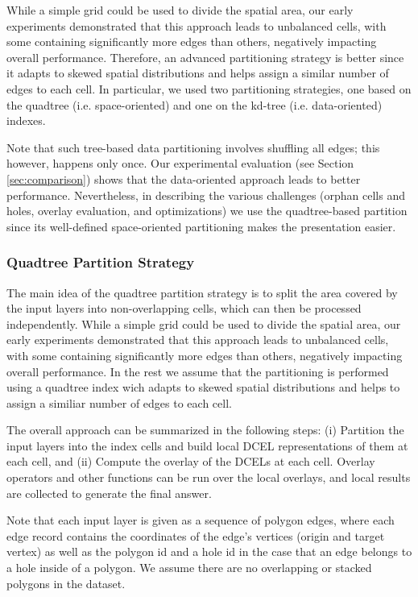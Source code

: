 While a simple grid could be used to divide the spatial area, our early experiments demonstrated that this approach leads to unbalanced cells, with some containing significantly more edges than others, negatively impacting overall performance.  Therefore, an advanced partitioning strategy is better since it adapts to skewed spatial distributions and helps assign a similar number of edges to each cell. In particular, we used two partitioning strategies, one based on the quadtree (i.e. space-oriented) and one on the kd-tree (i.e. data-oriented) indexes.

Note that such tree-based data partitioning involves shuffling all edges; this however, happens only once.  Our experimental evaluation (see Section \ref{sec:comparison}) shows that the data-oriented approach leads to better performance. Nevertheless, in describing the various challenges (orphan cells and holes, overlay evaluation, and optimizations) we use the quadtree-based partition since its well-defined space-oriented partitioning makes the presentation easier.

\subsubsection{Quadtree Partition Strategy}
\label{sec:strategy}

The main idea of the quadtree partition strategy is to split the area covered by the input layers into non-overlapping cells, which can then be processed independently.  While a simple grid could be used to divide the spatial area, our early experiments demonstrated that this approach leads to unbalanced cells, with some containing significantly more edges than others, negatively impacting overall performance.  In the rest we assume that the partitioning is performed using a quadtree index wich adapts to skewed spatial distributions and helps to assign a similiar number of edges to each cell.

The overall approach can be summarized in the following steps: (i) Partition the input layers into the index cells and build local DCEL representations of them at each cell, and (ii) Compute the overlay of the DCELs at each cell. Overlay operators and other functions can be run over the local overlays, and local results are collected to generate the final answer.

Note that each input layer is given as a sequence of polygon edges, where each edge record contains the coordinates of the edge's vertices (origin and target vertex) as well as the polygon id and a hole id in the case that an edge belongs to a hole inside of a polygon. We assume there are no overlapping or stacked polygons in the dataset.

